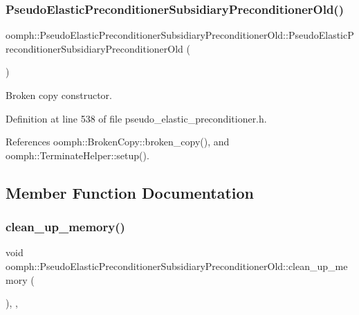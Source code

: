 \subsubsection{\texorpdfstring{Pseudo\+Elastic\+Preconditioner\+Subsidiary\+Preconditioner\+Old()}{PseudoElasticPreconditionerSubsidiaryPreconditionerOld()}\hspace{0.1cm}{\footnotesize\ttfamily [2/2]}}
{\footnotesize\ttfamily oomph\+::\+Pseudo\+Elastic\+Preconditioner\+Subsidiary\+Preconditioner\+Old\+::\+Pseudo\+Elastic\+Preconditioner\+Subsidiary\+Preconditioner\+Old (\begin{DoxyParamCaption}\item[{const \hyperlink{classoomph_1_1PseudoElasticPreconditionerSubsidiaryPreconditionerOld}{Pseudo\+Elastic\+Preconditioner\+Subsidiary\+Preconditioner\+Old} \&}]{ }\end{DoxyParamCaption})\hspace{0.3cm}{\ttfamily [inline]}}



Broken copy constructor. 



Definition at line 538 of file pseudo\+\_\+elastic\+\_\+preconditioner.\+h.



References oomph\+::\+Broken\+Copy\+::broken\+\_\+copy(), and oomph\+::\+Terminate\+Helper\+::setup().



\subsection{Member Function Documentation}
\mbox{\label{classoomph_1_1PseudoElasticPreconditionerSubsidiaryPreconditionerOld_a45086bd75b2d82f65deae8cac23c4c47}} 
\subsubsection{\texorpdfstring{clean\+\_\+up\+\_\+memory()}{clean\_up\_memory()}}
{\footnotesize\ttfamily void oomph\+::\+Pseudo\+Elastic\+Preconditioner\+Subsidiary\+Preconditioner\+Old\+::clean\+\_\+up\+\_\+memory (\begin{DoxyParamCaption}{ }\end{DoxyParamCaption})\hspace{0.3cm}{\ttfamily [inline]}, {\ttfamily [private]}, {\ttfamily [virtual]}}



